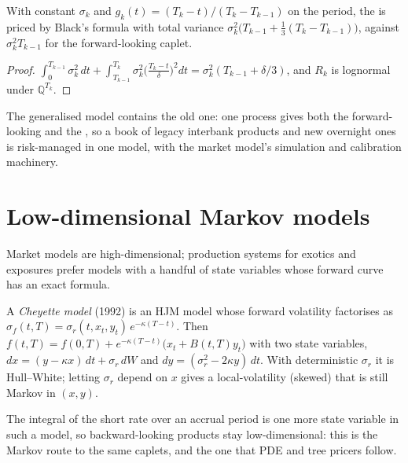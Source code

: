 \begin{proposition}\label{prop:rc:modelling-overnight-rate-products:gfmm}
With constant $\sigma_k$ and $g_k(t) = (T_k-t)/(T_k-T_{k-1})$ on the period, the
 is priced by Black's formula with total variance
$\sigma_k^2\bigl(T_{k-1}+\tfrac13(T_k-T_{k-1})\bigr)$, against $\sigma_k^2T_{k-1}$ for the
forward-looking caplet.
\end{proposition}
\begin{proof}
$\int_0^{T_{k-1}}\sigma_k^2\,dt+\int_{T_{k-1}}^{T_k}\sigma_k^2\bigl(\frac{T_k-t}{\delta}\bigr)^2dt =
\sigma_k^2(T_{k-1}+\delta/3)$, and $R_k$ is lognormal under $\mathbb Q^{T_k}$.
\end{proof}

The generalised model contains the old one: one process gives both the
forward-looking and the , so a book of legacy interbank
products and new overnight ones is risk-managed in one model, with the market
model's simulation and calibration machinery.

\section{Low-dimensional Markov models}

Market models are high-dimensional; production systems for exotics and
exposures prefer models with a handful of state variables whose forward curve
has an exact formula.

\begin{definition}\label{def:rc:modelling-overnight-rate-products:cheyette}
A \emph{Cheyette model} (1992) is an HJM model whose forward
volatility factorises as $\sigma_f(t,T) = \sigma_r(t,x_t,y_t)\,e^{-\kappa(T-t)}$. Then
$f(t,T) = f(0,T)+e^{-\kappa(T-t)}\bigl(x_t+B(t,T)y_t\bigr)$ with two state variables,
$dx = (y-\kappa x)\,dt+\sigma_r\,dW$ and $dy = (\sigma_r^2-2\kappa y)\,dt$. With
deterministic $\sigma_r$ it is Hull--White; letting $\sigma_r$ depend on $x$ gives a
local-volatility (skewed)  that is still Markov in $(x,y)$.
\end{definition}

The integral of the short rate over an accrual period is one more state variable
in such a model, so backward-looking products stay low-dimensional: this is the
Markov route to the same caplets, and the one that PDE and tree pricers follow.

